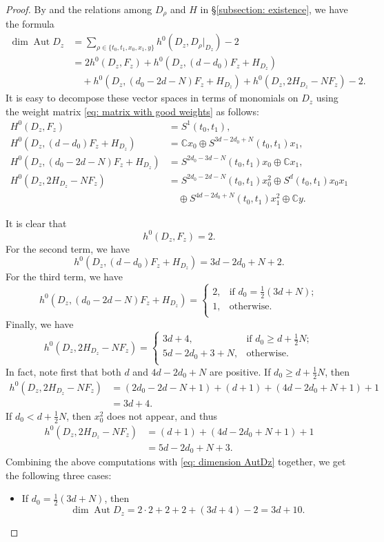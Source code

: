 \documentclass[a4paper,11pt]{amsart}
\newcommand{\CC}{\ensuremath{\mathbb{C}}}
\DeclareMathOperator{\Aut}{Aut}
\theoremstyle{definition}
\theoremstyle{remark}
\numberwithin{equation}{section}
\begin{document}
\begin{proof}
	By \cite[\S 4]{Cox} and the relations among $D_{\rho}$ and $H$ in \S \ref{subsection: existence}, we have the formula
	\begin{align}
		\dim\Aut D_z & = \sum_{\rho \in \{ t_0,t_1,x_0,x_1,y\}} h^0(D_z, D_{\rho}|_{D_z})-2 \nonumber \\
		& = 2h^0(D_z, F_z) + h^0(D_z, (d - d_0)F_z + H_{D_z}) \label{eq: dimension AutDz} \\
		& \quad + h^0(D_z, (d_0 - 2d - N)F_z + H_{D_z}) + h^0(D_z, 2H_{D_z} - NF_z)-2. \nonumber
	\end{align}
	It is easy to decompose these vector spaces in terms of monomials on $D_z$ using the weight matrix \eqref{eq: matrix with good weights} as follows:
	\begin{align*}
		H^0(D_z,F_z) & = S^1(t_0,t_1), \\
		H^0(D_z, (d-d_0)F_z+H_{D_z}) & = \CC x_0\oplus S^{3d - 2d_0 + N}(t_0,t_1) x_1, \\
		H^0(D_z, (d_0-2d-N)F_z+H_{D_z}) & = S^{2d_0 - 3d - N}(t_0,t_1) x_0 \oplus \CC x_1, \\
		H^0(D_z, 2H_{D_z} - NF_z) & = S^{2d_0 - 2d - N}(t_0,t_1) x_0^2 \oplus S^{d}(t_0,t_1) x_0 x_1 \\
		& \quad \oplus S^{4d - 2d_0 + N}(t_0,t_1) x_1^2 \oplus \CC y.
	\end{align*}
	
	It is clear that 
	$$
	h^0(D_z, F_z)=2.
	$$ 
	For the second term, we have
	$$
	h^0(D_z, (d-d_0)F_z + H_{D_z}) = 3d - 2d_0 + N + 2.
	$$
	For the third term, we have
	$$
	h^0(D_z, (d_0 - 2d - N)F_z + H_{D_z}) = 
	\begin{cases}
		2, & \text{if } d_0 = \frac12 (3d + N);\\
		1, & \text{otherwise}.\\
	\end{cases}
	$$
	Finally, we have
	$$
	h^0(D_z, 2H_{D_z} - NF_z)=
	\begin{cases}
		3d+4, &\text{if } d_0 \ge d + \frac12 N;\\
		5d - 2d_0 + 3 + N, &\text{otherwise}. \\
	\end{cases}
	$$
	In fact, note first that both $d$ and $4d - 2d_0 + N$ are positive. If $d_0 \ge d + \frac 12 N$, then
	\begin{align*}
		h^0(D_z, 2H_{D_z} - NF_z) & = (2d_0 - 2d - N + 1) + (d+1) + \left(4d - 2d_0 + N + 1\right) + 1 \\
		& = 3d + 4.
	\end{align*}
	If $d_0 < d + \frac 12 N$, then $x_0^2$ does not appear, and thus 
	\begin{align*}
		h^0(D_z, 2H_{D_z} - NF_z) & = (d+1) + \left(4d - 2d_0 + N + 1\right) + 1 \\
		& = 5d - 2d_0 + N + 3.
	\end{align*}
	Combining the above computations with \eqref{eq: dimension AutDz} together, we get the following three cases:
	\begin{itemize}
		\item [(1)] If $d_0 = \frac12(3d + N)$, then
		$$
		\dim\Aut D_z=2\cdot 2 + 2 + 2 + (3d+4) - 2 = 3d+10.
		$$
			

\end{itemize}
\end{proof}
\end{document}
